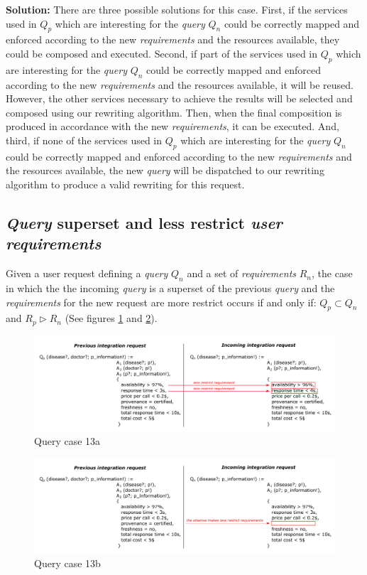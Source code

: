 \bigskip
\noindent \textbf{Solution:} There are three possible solutions for this case. First, if the services used in $Q_{p}$ which are interesting for the \textsl{query} $Q_{n}$ could be correctly mapped and enforced according to the new \textsl{requirements} and the resources available, they could be composed and executed. Second, if part of the services  used in $Q_{p}$ which are interesting for the \textsl{query} $Q_{n}$ could be correctly mapped and enforced according to the new \textsl{requirements} and the resources available, it will be reused. However, the other services necessary to achieve the results will be selected and composed using our rewriting algorithm. Then, when the final composition is produced in accordance with the new \textsl{requirements}, it can be executed. And, third, if none of the services used in $Q_{p}$ which are interesting for the \textsl{query} $Q_{n}$ could be correctly mapped and enforced according to the new \textsl{requirements} and the resources available, the new \textsl{query} will be dispatched to our rewriting algorithm to produce a valid rewriting for this request.

\subsection{\textsl{Query} superset and less restrict \textsl{user requirements}}
Given a user request defining a \textsl{query} $Q_{n}$ and a set of \textsl{requirements} $R_{n}$, the case in which the the incoming \textsl{query} is a superset of the previous \textsl{query} and the \textsl{requirements} for the new request are more restrict occurs if and only if: $Q_{p} \subset Q_{n}$ and $R_{p} \triangleright R_{n}$ (See figures \ref{fig:case13a} and \ref{fig:case13b}).

\begin{figure}[h!]
\center
\includegraphics[scale=0.85]{figures/query-case-13a.pdf}\caption{Query case 13a} \label{fig:case13a}
\end{figure}

\begin{figure}[h!]
\center
\includegraphics[scale=0.85]{figures/query-case-13b.pdf}\caption{Query case 13b} \label{fig:case13b}
\end{figure}

